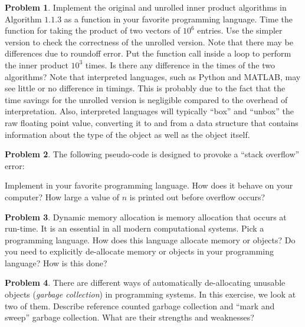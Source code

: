 \documentclass{article}
\theoremstyle{definition}
\newtheorem{problem}{Problem}[subsection]
\newcommand{\courier}[1]{{\fontfamily{pcr}\selectfont#1}}
\begin{document}
	\newpage
	\setcounter{problem}{3}
	\begin{problem}
		Implement the original and unrolled inner product algorithms in Algorithm \(1.1.3\) as a function in your favorite programming language. Time the function for taking the product of two vectors of \(10^6\) entries. Use the simpler version to check the correctness of the unrolled version. Note that there may be differences due to roundoff error. Put the function call inside a loop to perform the inner product \(10^3\) times. Is there any difference in the times of the two algorithms? Note	that interpreted languages, such as Python and MATLAB, may see little or no difference in timings. This is probably due to the fact that the time savings for the unrolled version is negligible compared to the overhead of interpretation. Also, interpreted languages will typically ``box'' and ``unbox'' the raw floating point value, converting it to and from a data structure that contains information about the type of the object as well as the object itself.
	\end{problem}
	
	\newpage
	\setcounter{problem}{4}
	\begin{problem}
		The following pseudo-code is designed to provoke a ``stack overflow'' error:
		\begin{figure*}[h!]
			\centering 
			\begin{algorithmic}
						\State \courier{print(\(n\))}
					\EndIf
					\State \courier{OVERFLOW(\(n+1\))}
				\EndFunction
			\end{algorithmic}
		\end{figure*}
	
	
	\noindent Implement in your favorite programming language. How does it behave on your
	computer? How large a value of \(n\) is printed out before overflow occurs?
	\end{problem}
	
	\newpage
	\setcounter{problem}{5}
	\begin{problem}
		Dynamic memory allocation is memory allocation that occurs at run-time. It is
		an essential in all modern computational systems. Pick a programming language.
		How does this language allocate memory or objects? Do you need to explicitly
		de-allocate memory or objects in your programming language? How is this done?
	\end{problem}
	
	\newpage
	\setcounter{problem}{6}
	\begin{problem}
		There are different ways of automatically de-allocating unusable objects (\textit{garbage collection}) in programming systems. In this exercise, we look at two of them. Describe reference counted garbage collection and ``mark and sweep'' garbage collection. What are their strengths and weaknesses?
	\end{problem}
	
\end{document}
